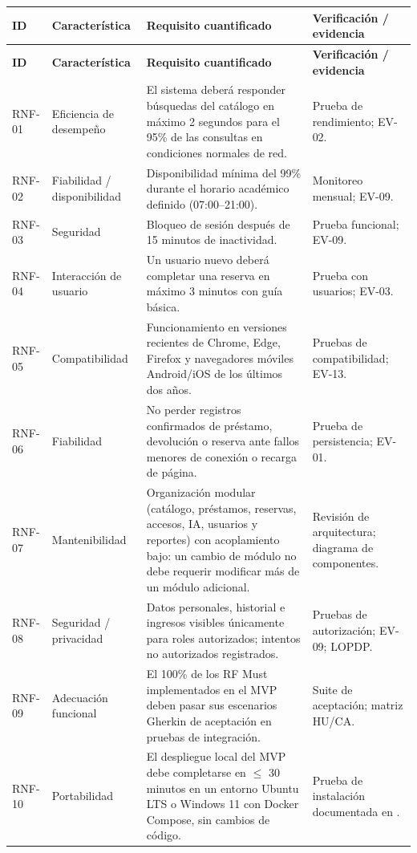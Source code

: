 \documentclass[12pt,journal,onecolumn]{IEEEtran}
\begin{document}
\begin{longtable}{P{0.10\textwidth}P{0.20\textwidth}P{0.48\textwidth}P{0.17\textwidth}}\toprule
\textbf{ID} & \textbf{Característica} & \textbf{Requisito cuantificado} & \textbf{Verificación / evidencia}\\\midrule\endfirsthead
\toprule\textbf{ID} & \textbf{Característica} & \textbf{Requisito cuantificado} & \textbf{Verificación / evidencia}\\\midrule\endhead
RNF-01 & Eficiencia de desempeño & El sistema deberá responder búsquedas del catálogo en máximo 2 segundos para el 95\% de las consultas en condiciones normales de red. & Prueba de rendimiento; EV-02.\\
RNF-02 & Fiabilidad / disponibilidad & Disponibilidad mínima del 99\% durante el horario académico definido (07:00--21:00). & Monitoreo mensual; EV-09.\\
RNF-03 & Seguridad & Bloqueo de sesión después de 15 minutos de inactividad. & Prueba funcional; EV-09.\\
RNF-04 & Interacción de usuario & Un usuario nuevo deberá completar una reserva en máximo 3 minutos con guía básica. & Prueba con usuarios; EV-03.\\
RNF-05 & Compatibilidad & Funcionamiento en versiones recientes de Chrome, Edge, Firefox y navegadores móviles Android/iOS de los últimos dos años. & Pruebas de compatibilidad; EV-13.\\
RNF-06 & Fiabilidad & No perder registros confirmados de préstamo, devolución o reserva ante fallos menores de conexión o recarga de página. & Prueba de persistencia; EV-01.\\
RNF-07 & Mantenibilidad & Organización modular (catálogo, préstamos, reservas, accesos, IA, usuarios y reportes) con acoplamiento bajo: un cambio de módulo no debe requerir modificar más de un módulo adicional. & Revisión de arquitectura; diagrama de componentes.\\
RNF-08 & Seguridad / privacidad & Datos personales, historial e ingresos visibles únicamente para roles autorizados; intentos no autorizados registrados. & Pruebas de autorización; EV-09; LOPDP.\\
RNF-09 & Adecuación funcional & El 100\% de los RF Must implementados en el MVP deben pasar sus escenarios Gherkin de aceptación en pruebas de integración. & Suite de aceptación; matriz HU/CA.\\
RNF-10 & Portabilidad & El despliegue local del MVP debe completarse en $\leq$ 30 minutos en un entorno Ubuntu LTS o Windows 11 con Docker Compose, sin cambios de código. & Prueba de instalación documentada en .\\

\end{longtable}
\end{document}

